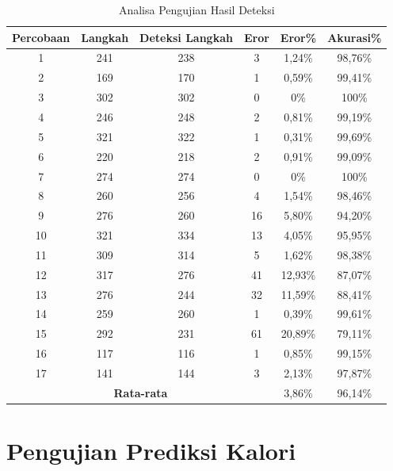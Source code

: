 \begin{longtable}{|c|c|c|c|c|c|}
  \caption{Analisa Pengujian Hasil Deteksi}
  \label{tb:AnalisaDeteksi}                                   \\
  \hline
  \rowcolor[HTML]{C0C0C0}
  \textbf{Percobaan} & \textbf{Langkah} & \textbf{Deteksi Langkah} & \textbf{Eror} & \textbf{Eror\%} & \textbf{Akurasi\%} \\
  \hline
  1   & 241   & 238   & 3    & 1,24\%    & 98,76\%   \\
  \hline
  2   & 169   & 170   & 1    & 0,59\%    & 99,41\%   \\
  \hline
  3   & 302   & 302   & 0    & 0\%       & 100\%     \\
  \hline
  4   & 246   & 248   & 2    & 0,81\%    & 99,19\%   \\
  \hline
  5   & 321   & 322   & 1    & 0,31\%    & 99,69\%   \\
  \hline
  6   & 220   & 218   & 2    & 0,91\%    & 99,09\%   \\
  \hline
  7   & 274   & 274   & 0    & 0\%       & 100\%   \\
  \hline
  8   & 260   & 256   & 4    & 1,54\%    & 98,46\%   \\
  \hline
  9   & 276   & 260   & 16   & 5,80\%    & 94,20\%   \\
  \hline
  10   & 321   & 334  & 13   & 4,05\%    & 95,95\%   \\
  \hline
  11   & 309   & 314  & 5    & 1,62\%    & 98,38\%   \\
  \hline
  12   & 317   & 276  & 41   & 12,93\%   & 87,07\%   \\
  \hline
  13   & 276   & 244  & 32   & 11,59\%   & 88,41\%   \\
  \hline
  14   & 259   & 260  & 1    & 0,39\%    & 99,61\%   \\
  \hline
  15   & 292   & 231  & 61   & 20,89\%   & 79,11\%   \\
  \hline
  16   & 117   & 116  & 1    & 0,85\%    & 99,15\%   \\
  \hline
  17   & 141   & 144  & 3    & 2,13\%    & 97,87\%   \\
  \hline

  \multicolumn{4}{|c|}{\textbf{Rata-rata}} & 3,86\% & 96,14\% \\
  \hline
\end{longtable}


\section{Pengujian Prediksi Kalori}
\label{sec:PengujianPrediksi}

